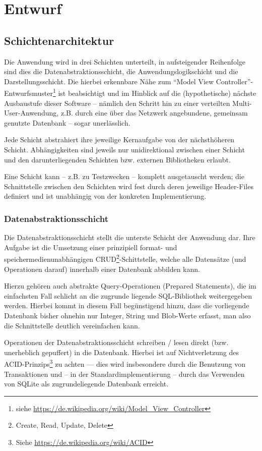 \section{Entwurf}
\subsection{Schichtenarchitektur}
Die Anwendung wird in drei Schichten unterteilt, in aufsteigender Reihenfolge sind
dies die Datenabstraktionsschicht, die Anwendungslogikschicht und die Darstellungsschicht. Die
hierbei erkennbare Nähe zum ``Model View Controller''-Entwurfsmuster\footnote{siehe
\url{https://de.wikipedia.org/wiki/Model_View_Controller}} ist beabsichtigt und
im Hinblick auf die (hypothetische) nächste Ausbaustufe dieser Software --
nämlich den Schritt hin zu einer verteilten Multi-User-Anwendung, z.B. durch eine
über das Netzwerk angebundene, gemeinsam genutzte Datenbank -- sogar unerlässlich.

Jede Schicht abstrahiert ihre jeweilige Kernaufgabe von der nächsthöheren Schicht.
Abhängigkeiten sind jeweils nur unidirektional zwischen einer Schicht und
den darunterliegenden Schichten bzw. externen Bibliotheken erlaubt.

Eine Schicht kann -- z.B. zu Testzwecken -- komplett ausgetauscht werden; die
Schnittstelle zwischen den Schichten wird fest durch deren jeweilige Header-Files
definiert und ist unabhängig von der konkreten Implementierung.

\subsubsection{Datenabstraktionsschicht}
\label{datenabstraktionsschicht}
Die Datenabstraktionsschicht stellt die unterste Schicht der Anwendung dar.
Ihre Aufgabe ist die Umsetzung einer prinzipiell format- und speichermedienunabhängigen
CRUD\footnote{Create, Read, Update, Delete}-Schittstelle, welche alle Datensätze
(und Operationen darauf) innerhalb einer Datenbank abbilden kann.

Hierzu gehören auch abstrakte Query-Operationen (Prepared Statements), die im
einfachsten Fall schlicht an die zugrunde liegende SQL-Bibliothek weitergegeben
werden. Hierbei kommt in diesem Fall begünstigend hinzu, dass die vorliegende Datenbank
bisher ohnehin nur Integer, String und Blob-Werte erfasst, man also die Schnittstelle deutlich
vereinfachen kann.

Operationen der Datenabstraktionsschicht schreiben / lesen direkt (bzw. unerheblich
gepuffert) in die Datenbank. Hierbei ist auf Nichtverletzung des ACID-Prinzips\footnote{Siehe
\url{https://de.wikipedia.org/wiki/ACID}} zu achten --- dies wird insbesondere durch die Benutzung
von Transaktionen und -- in der Standardimplementierung -- durch das Verwenden von SQLite als
zugrundeliegende Datenbank erreicht.

